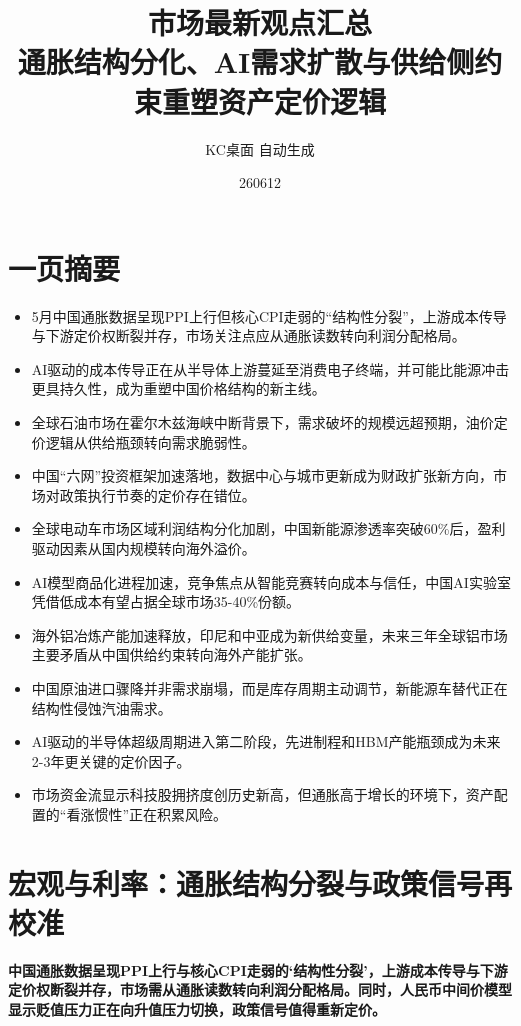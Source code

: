 \documentclass[11pt]{ctexart}
\title{\textbf{市场最新观点汇总}\\[0.4em]{\large 通胀结构分化、AI需求扩散与供给侧约束重塑资产定价逻辑}}
\author{KC桌面 自动生成}
\date{260612}
\begin{document}
\maketitle
\tableofcontents
\newpage
\section{一页摘要}
\begin{itemize}
  \item 5月中国通胀数据呈现PPI上行但核心CPI走弱的“结构性分裂”，上游成本传导与下游定价权断裂并存，市场关注点应从通胀读数转向利润分配格局。
  \item AI驱动的成本传导正在从半导体上游蔓延至消费电子终端，并可能比能源冲击更具持久性，成为重塑中国价格结构的新主线。
  \item 全球石油市场在霍尔木兹海峡中断背景下，需求破坏的规模远超预期，油价定价逻辑从供给瓶颈转向需求脆弱性。
  \item 中国“六网”投资框架加速落地，数据中心与城市更新成为财政扩张新方向，市场对政策执行节奏的定价存在错位。
  \item 全球电动车市场区域利润结构分化加剧，中国新能源渗透率突破60\%后，盈利驱动因素从国内规模转向海外溢价。
  \item AI模型商品化进程加速，竞争焦点从智能竞赛转向成本与信任，中国AI实验室凭借低成本有望占据全球市场35-40\%份额。
  \item 海外铝冶炼产能加速释放，印尼和中亚成为新供给变量，未来三年全球铝市场主要矛盾从中国供给约束转向海外产能扩张。
  \item 中国原油进口骤降并非需求崩塌，而是库存周期主动调节，新能源车替代正在结构性侵蚀汽油需求。
  \item AI驱动的半导体超级周期进入第二阶段，先进制程和HBM产能瓶颈成为未来2-3年更关键的定价因子。
  \item 市场资金流显示科技股拥挤度创历史新高，但通胀高于增长的环境下，资产配置的“看涨惯性”正在积累风险。
\end{itemize}
\section{宏观与利率：通胀结构分裂与政策信号再校准}
\textbf{中国通胀数据呈现PPI上行与核心CPI走弱的‘结构性分裂’，上游成本传导与下游定价权断裂并存，市场需从通胀读数转向利润分配格局。同时，人民币中间价模型显示贬值压力正在向升值压力切换，政策信号值得重新定价。}
\end{document}
